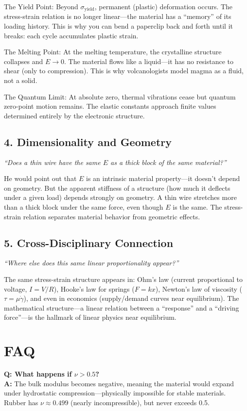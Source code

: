 The Yield Point: Beyond $\sigma_{\text{yield}}$, permanent (plastic) deformation occurs. The stress-strain relation is no longer linear---the material has a ``memory'' of its loading history. This is why you can bend a paperclip back and forth until it breaks: each cycle accumulates plastic strain.

The Melting Point: At the melting temperature, the crystalline structure collapses and $E \to 0$. The material flows like a liquid---it has no resistance to shear (only to compression). This is why volcanologists model magma as a fluid, not a solid.

The Quantum Limit: At absolute zero, thermal vibrations cease but quantum zero-point motion remains. The elastic constants approach finite values determined entirely by the electronic structure.

\subsection*{4. Dimensionality and Geometry}
\textit{``Does a thin wire have the same $E$ as a thick block of the same material?''}

He would point out that $E$ is an intrinsic material property---it doesn't depend on geometry. But the apparent stiffness of a structure (how much it deflects under a given load) depends strongly on geometry. A thin wire stretches more than a thick block under the same force, even though $E$ is the same. The stress-strain relation separates material behavior from geometric effects.

\subsection*{5. Cross-Disciplinary Connection}
\textit{``Where else does this same linear proportionality appear?''}

The same stress-strain structure appears in: Ohm's law (current proportional to voltage, $I = V/R$), Hooke's law for springs ($F = kx$), Newton's law of viscosity ($\tau = \mu \dot{\gamma}$), and even in economics (supply/demand curves near equilibrium). The mathematical structure---a linear relation between a ``response'' and a ``driving force''---is the hallmark of linear physics near equilibrium.
\section*{FAQ}

\textbf{Q: What happens if $\nu > 0.5$?}\\
\textbf{A:} The bulk modulus becomes negative, meaning the material would expand under hydrostatic compression---physically impossible for stable materials. Rubber has $\nu \approx 0.499$ (nearly incompressible), but never exceeds 0.5.

